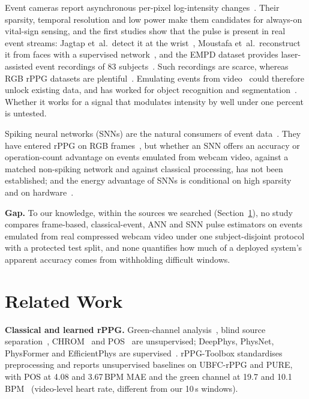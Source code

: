 \documentclass[10pt,journal]{IEEEtran}
\begin{document}
Event cameras report asynchronous per-pixel log-intensity changes~\cite{lichtsteiner2008dvs,gallego2022survey}. Their sparsity, temporal resolution and low power make them candidates for always-on vital-sign sensing, and the first studies show that the pulse is present in real event streams: Jagtap et~al.\ detect it at the wrist~\cite{jagtap2023hr}, Moustafa et~al.\ reconstruct it from faces with a supervised network~\cite{moustafa2025event}, and the EMPD dataset provides laser-assisted event recordings of 83 subjects~\cite{feng2026empd}. Such recordings are scarce, whereas RGB rPPG datasets are plentiful~\cite{bobbia2019ubfc,tang2023mmpd,egorov2025mcd,mcduff2022scamps}. Emulating events from video~\cite{rebecq2018esim,hu2021v2e,gehrig2020video2events} could therefore unlock existing data, and has worked for object recognition and segmentation~\cite{gehrig2020video2events}. Whether it works for a signal that modulates intensity by well under one percent is untested.

Spiking neural networks (SNNs) are the natural consumers of event data~\cite{neftci2019surrogate,eshraghian2023snntorch}. They have entered rPPG on RGB frames~\cite{liu2025spikingphysformer}, but whether an SNN offers an accuracy or operation-count advantage on events emulated from webcam video, against a matched non-spiking network and against classical processing, has not been established; and the energy advantage of SNNs is conditional on high sparsity and on hardware~\cite{dampfhoffer2023,lemaire2022}.

\textbf{Gap.} To our knowledge, within the sources we searched (Section~\ref{sec:related}), no study compares frame-based, classical-event, ANN and SNN pulse estimators on events emulated from real compressed webcam video under one subject-disjoint protocol with a protected test split, and none quantifies how much of a deployed system's apparent accuracy comes from withholding difficult windows.

\section{Related Work}\label{sec:related}
\textbf{Classical and learned rPPG.} Green-channel analysis~\cite{verkruysse2008}, blind source separation~\cite{poh2010}, CHROM~\cite{dehaan2013chrom} and POS~\cite{wang2017pos} are unsupervised; DeepPhys, PhysNet, PhysFormer and EfficientPhys are supervised~\cite{chen2018deepphys,yu2019physnet,yu2022physformer,liu2023efficientphys}. rPPG-Toolbox standardises preprocessing and reports unsupervised baselines on UBFC-rPPG and PURE, with POS at 4.08 and 3.67\,BPM MAE and the green channel at 19.7 and 10.1\,BPM~\cite{liu2023rppgtoolbox} (video-level heart rate, different from our 10\,s windows).
\end{document}
